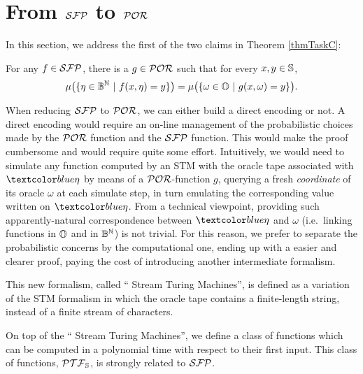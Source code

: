 \section{From $\mathcal{SFP}$ to $\mathcal{POR}$}\label{sec:SFPtoPOR}
%
%

In this section, we address the first of the two claims in
Theorem \ref{thmTaskC}:

\begin{lemma}\label{lemma:taskC1}
For any $f\in \mathcal{SFP}$, there is a $g \in \mathcal{POR}$
such that for every $x,y\in \mathbb{S}$,
$$
\mu\big(\{\eta \in \mathbb{B}^{\mathbb{N}} \ | \ f(x, \eta)=y \}\big)
= \mu\big(\{\omega \in \mathbb{O} \ | \ g(x,\omega) =y\}\big).
$$
\end{lemma}

When reducing $\mathcal{SFP}$ to $\mathcal{POR}$, we can either build
a direct encoding or not. A direct encoding would require
an on-line management of the probabilistic choices made by
the $\mathcal{POR}$ function and the $\mathcal{SFP}$ function.
This would make the proof cumbersome and would require
quite some effort.
Intuitively, we would need to simulate any function computed
by an STM with the oracle tape associated with
$\m{\eta}$
by means of a
$\mathcal{POR}$-function $g$,
querying a fresh \emph{coordinate} of its
oracle $\omega$ at each simulate step,
in turn emulating
the corresponding value written
on $\m{\eta}$.
From a technical viewpoint, providing such
apparently-natural correspondence between
$\m{\eta}$ and $\omega$ (i.e.~linking functions
in $\mathbb{O}$ and in $\mathbb{B}^{\mathbb{N}}$)
is not trivial.
%
For this reason, we prefer to separate the probabilistic concerns by
the computational one, ending up with a easier and clearer proof,
paying the cost of introducing another intermediate formalism.

This new formalism, called `` Stream Turing Machines'',
is defined as a variation of the STM formalism in which the oracle
tape contains a finite-length string, instead of a finite stream of
characters.

On top of the `` Stream Turing Machines'', we define a
class of functions which can be computed in a polynomial time with
respect to their first input. This class of functions, $\mathcal{PTF}_{\mathbb{S}}$, is
strongly related to $\mathcal{SFP}$.



